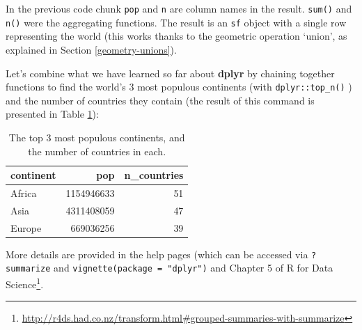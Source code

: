 \documentclass[]{krantz}
\newenvironment{Shaded}{\begin{snugshade}}{\end{snugshade}}
\newcommand{\DataTypeTok}[1]{\textcolor[rgb]{0.27,0.27,0.27}{#1}}
\newcommand{\DecValTok}[1]{\textcolor[rgb]{0.06,0.06,0.06}{#1}}
\newcommand{\KeywordTok}[1]{\textcolor[rgb]{0.27,0.27,0.27}{\textbf{#1}}}
\newcommand{\NormalTok}[1]{#1}
\newcommand{\OperatorTok}[1]{\textcolor[rgb]{0.43,0.43,0.43}{\textbf{#1}}}
\newcommand{\OtherTok}[1]{\textcolor[rgb]{0.37,0.37,0.37}{#1}}
\newcommand{\StringTok}[1]{\textcolor[rgb]{0.5,0.5,0.5}{#1}}
\let\rmarkdownfootnote\footnote%
\def\footnote{\protect\rmarkdownfootnote}
\renewcommand{\href}[2]{#2\footnote{\url{#1}}}
\let\BeginKnitrBlock\begin \let\EndKnitrBlock\end
\begin{document}
In the previous code chunk \texttt{pop} and \texttt{n} are column names in the result.
\texttt{sum()} and \texttt{n()} were the aggregating functions.
The result is an \texttt{sf} object with a single row representing the world (this works thanks to the geometric operation `union', as explained in Section \ref{geometry-unions}).

Let's combine what we have learned so far about \textbf{dplyr} by chaining together functions to find the world's 3 most populous continents (with \texttt{dplyr::top\_n()} ) and the number of countries they contain (the result of this command is presented in Table \ref{tab:continents}):

\begin{Shaded}
\end{Shaded}

\begin{table}[t]

\caption[Top 3 most populous continents.]{\label{tab:continents}The top 3 most populous continents, and the number of countries in each.}
\centering
\begin{tabular}{lrr}
\toprule
continent & pop & n\_countries\\
\midrule
Africa & 1154946633 & 51\\
Asia & 4311408059 & 47\\
Europe & 669036256 & 39\\
\bottomrule
\end{tabular}
\end{table}

\BeginKnitrBlock{rmdnote}
More details are provided in the help pages (which can be accessed via \texttt{?summarize} and \texttt{vignette(package\ =\ "dplyr")} and Chapter 5 of \href{http://r4ds.had.co.nz/transform.html\#grouped-summaries-with-summarize}{R for Data Science}.
\EndKnitrBlock{rmdnote}
\end{document}
